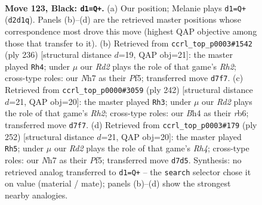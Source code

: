 \documentclass[11pt]{article}
\begin{document}
\clearpage

\begin{figure}[p]\centering
\begin{subfigure}{0.46\textwidth}\centering
\resizebox{\linewidth}{!}{%
\newchessgame
\chessboard[
  setfen={1R6/3r3n/8/4p2p/7b/8/2Kp2k1/8 b - - 11 123},
  showmover=false,
  pgfstyle=straightmove, color=movearrow, markmove={d2-d1}
]}
\caption{}
\end{subfigure}\hfill
\begin{subfigure}{0.46\textwidth}\centering
\resizebox{\linewidth}{!}{%
\newchessgame
\chessboard[
  setfen={8/4K2k/7P/5P2/8/8/7R/1r6 w - - 89 119},
  showmover=false,
  pgfstyle=straightmove, color=movearrow, markmove={h2-h4}
]}
\caption{}
\end{subfigure}
\\[4pt]
\begin{subfigure}{0.46\textwidth}\centering
\resizebox{\linewidth}{!}{%
\newchessgame
\chessboard[
  setfen={7k/4K2P/1r6/5P2/8/8/7R/8 w - - 17 122},
  showmover=false,
  pgfstyle=straightmove, color=movearrow, markmove={h2-h3}
]}
\caption{}
\end{subfigure}\hfill
\begin{subfigure}{0.46\textwidth}\centering
\resizebox{\linewidth}{!}{%
\newchessgame
\chessboard[
  setfen={8/5K1k/7P/5P2/7R/8/8/1r6 w - - 81 127},
  showmover=false,
  pgfstyle=straightmove, color=movearrow, markmove={h4-h5}
]}
\caption{}
\end{subfigure}
\caption{\textbf{Move 123, Black: \texttt{d1=Q+}.} (a) Our position; Melanie plays \texttt{d1=Q+} (\texttt{d2d1q}). Panels (b)--(d) are the retrieved master positions whose correspondence most drove this move (highest QAP objective among those that transfer to it). (b) Retrieved from \texttt{ccrl\_top\_p0003\#1542} (ply 236) [structural distance $d$=19, QAP obj=21]: the master played \texttt{Rh4}; under $\mu$ our \emph{Rd2} plays the role of that game's \emph{Rh2}; cross-type roles: our \emph{N}h7 as their \emph{P}f5; transferred move \texttt{d7f7}. (c) Retrieved from \texttt{ccrl\_top\_p0000\#3059} (ply 242) [structural distance $d$=21, QAP obj=20]: the master played \texttt{Rh3}; under $\mu$ our \emph{Rd2} plays the role of that game's \emph{Rh2}; cross-type roles: our \emph{B}h4 as their \emph{r}b6; transferred move \texttt{d7f7}. (d) Retrieved from \texttt{ccrl\_top\_p0003\#179} (ply 252) [structural distance $d$=21, QAP obj=20]: the master played \texttt{Rh5}; under $\mu$ our \emph{Rd2} plays the role of that game's \emph{Rh4}; cross-type roles: our \emph{N}h7 as their \emph{P}f5; transferred move \texttt{d7d5}. Synthesis: no retrieved analog transferred to \texttt{d1=Q+} -- the \texttt{search} selector chose it on value (material / mate); panels (b)--(d) show the strongest nearby analogies.}
\label{fig:thought-m245}
\end{figure}
\end{document}
